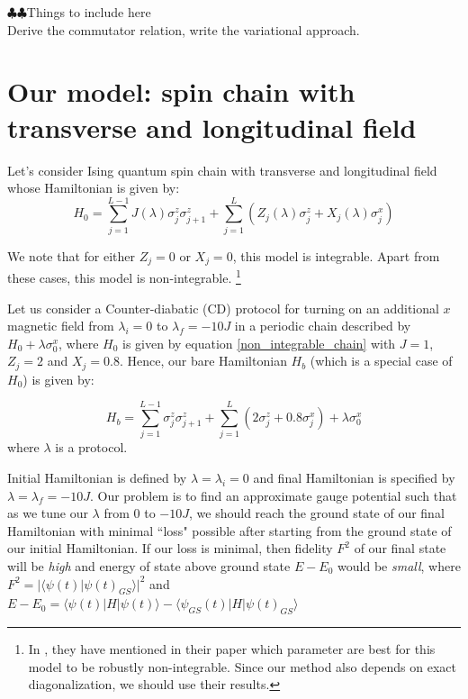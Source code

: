\documentclass[11pt,a4paper]{article}
\begin{document}
$\clubsuit \clubsuit $Things to include here \\
Derive the commutator relation, write the variational approach.

\section{Our model: spin chain with transverse and longitudinal field}
Let's consider Ising quantum spin chain with transverse and longitudinal field whose Hamiltonian is given by:
\begin{equation}
H_0=\sum_{j=1}^{L-1} J(\lambda) \sigma_j^z \sigma_{j+1}^z + \sum_{j=1}^{L}  (Z_j (\lambda) \sigma_j^z +X_j (\lambda) \sigma_j^x)
\label{non_integrable_chain}
\end{equation}

We note that for either $Z_j=0$ or $X_j=0$, this model is integrable. Apart from these cases, this model is non-integrable. \footnote{In \cite{kim2013ballistic}, they have mentioned in their paper which parameter are best for this model to be robustly non-integrable. Since our method also depends on exact diagonalization, we should use their results.}

Let us consider a Counter-diabatic (CD) protocol for turning on an additional $x$ magnetic field from $\lambda_i=0$ to $\lambda_f=-10 J$ in a periodic chain described by $H_0 + \lambda \sigma_0^x$, where $H_0$ is given by equation \ref{non_integrable_chain} with $J=1$, $Z_j=2$ and $X_j=0.8$. Hence, our bare Hamiltonian $H_b$ (which is a special case of $H_0$) is given by:

\begin{equation}
H_b=\sum_{j=1}^{L-1}  \sigma_j^z \sigma_{j+1}^z + \sum_{j=1}^{L}   ( 2 \sigma_j^z + 0.8 \sigma_j^x) +\lambda \sigma_0^x
\label{non_integrable_chain_bare}
\end{equation}
where $\lambda$ is a protocol. 

Initial Hamiltonian is defined by $\lambda=\lambda_i=0$ and final Hamiltonian is specified by $\lambda=\lambda_f=-10J$. Our problem is to find an approximate gauge potential such that as we tune our $\lambda$ from $0$ to $-10J$, we should reach the ground state of our final Hamiltonian with minimal ``loss" possible after starting from the ground state of our initial Hamiltonian. If our loss is minimal, then fidelity $F^2$ of our final state will be \textit{high} and energy of state above ground state $E-E_0$ would be \textit{small}, where  $F^2 =  |\langle \psi (t) |\psi(t)_{GS}\rangle|^2$ and $ E-E_0=\langle \psi (t) |H|\psi(t)\rangle - \langle \psi_{GS} (t) |H|\psi(t)_{GS}\rangle$ 
\end{document}
